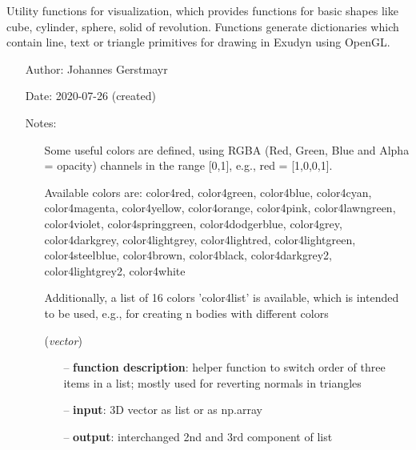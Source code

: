 \begin{itemize}[leftmargin=1.4cm]
\begin{itemize}[leftmargin=1.4cm]
\begin{itemize}[leftmargin=1.4cm]
\begin{itemize}[leftmargin=0.5cm]
\begin{itemize}[leftmargin=1.4cm]
\begin{itemize}[leftmargin=1.4cm]
\begin{itemize}[leftmargin=0.5cm]
\ei

%
\label{sec:module:graphicsDataUtilities}
  Utility functions for visualization, which provides functions for basic shapes
           like cube, cylinder, sphere, solid of revolution. Functions generate dictionaries
           which contain line, text or triangle primitives for drawing in Exudyn using OpenGL.
\begin{itemize}[leftmargin=1.4cm]
\setlength{\itemindent}{-1.4cm}
\item[]Author:    Johannes Gerstmayr
\item[]Date:      2020-07-26 (created)
\item[]Notes:
\vspace{-22pt}\begin{itemize}[leftmargin=0.5cm]
\setlength{\itemindent}{-0.5cm}
\item[]    Some useful colors are defined, using RGBA (Red, Green, Blue and Alpha = opacity) channels            in the range [0,1], e.g., red = [1,0,0,1].
\item[]            Available colors are: color4red, color4green, color4blue, color4cyan, color4magenta, color4yellow, color4orange, color4pink, color4lawngreen, color4violet, color4springgreen, color4dodgerblue, color4grey, color4darkgrey, color4lightgrey, color4lightred, color4lightgreen, color4steelblue, color4brown, color4black, color4darkgrey2, color4lightgrey2, color4white
\item[]            Additionally, a list of 16 colors 'color4list' is available, which is intended to be used, e.g., for creating n bodies with different colors 
\ei
\ei
\begin{flushleft}
\label{sec:graphicsDataUtilities:SwitchTripletOrder}
({\it vector})
\end{flushleft}
\setlength{\itemindent}{0.7cm}
\begin{itemize}[leftmargin=0.7cm]
\item[--]
{\bf function description}: helper function to switch order of three items in a list; mostly used for reverting normals in triangles
\item[--]
{\bf input}: 3D vector as list or as np.array
\item[--]
{\bf output}: interchanged 2nd and 3rd component of list
\vspace{12pt}\end{itemize}

\end{itemize}
\end{itemize}
\end{itemize}
\end{itemize}
\end{itemize}
\end{itemize}
\end{itemize}
\end{itemize}
\end{itemize}
